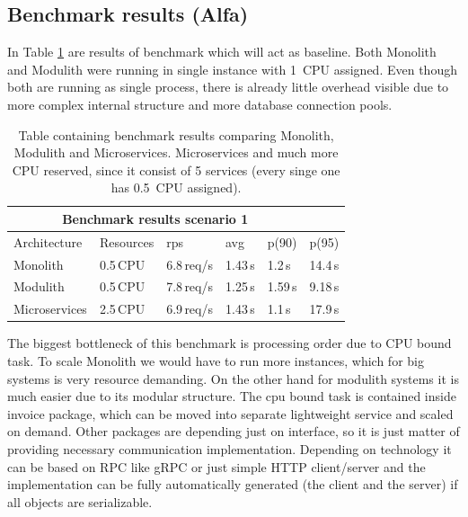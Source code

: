 \subsection{Benchmark results (Alfa)}

In Table \ref{table:benchmark_baseline} are results of benchmark which will act as baseline. Both Monolith and Modulith were running in single instance with 1~CPU assigned. Even though both are running as single process, there is already little overhead visible due to more complex internal structure and more database connection pools.

\begin{table}
    \begin{tabular}{ |p{3cm}||p{3cm}|p{1.5cm}|p{1.5cm}|p{1.5cm}|p{1.5cm}| }
        \hline
        \multicolumn{5}{|c|}{Benchmark results scenario 1}                   \\
        \hline
        Architecture  & Resources & rps        & avg     & p(90)   & p(95)   \\
        \hline
        Monolith      & 0.5\,CPU  & 6.8\,req/s & 1.43\,s & 1.2\,s  & 14.4\,s \\
        Modulith      & 0.5\,CPU  & 7.8\,req/s & 1.25\,s & 1.59\,s & 9.18\,s \\
        Microservices & 2.5\,CPU  & 6.9\,req/s & 1.43\,s & 1.1\,s  & 17.9\,s \\
        \hline
    \end{tabular}
    \caption{Table containing benchmark results comparing Monolith, Modulith and Microservices. Microservices and much more CPU reserved, since it consist of 5 services (every singe one has 0.5~CPU assigned).\label{table:benchmark_baseline}}
\end{table}

The biggest bottleneck of this benchmark is processing order due to CPU bound task. To scale Monolith we would have to run more instances, which for big systems is very resource demanding. On the other hand for modulith systems it is much easier due to its modular structure. The cpu bound task is contained inside invoice package, which can be moved into separate lightweight service and scaled on demand. Other packages are depending just on interface, so it is just matter of providing necessary communication implementation. Depending on technology it can be based on RPC like gRPC or just simple HTTP client/server and the implementation can be fully automatically generated (the client and the server) if all objects are serializable.

